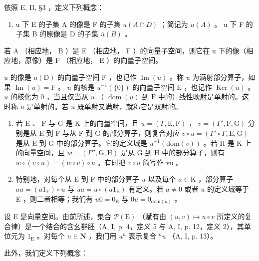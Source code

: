 依照 E, II, §3 ，定义下列概念：

\begin{enumerate}
\def\labelenumi{(\roman{enumi})}
\tightlist
\item
  u 下 E 的子集 A 的像是 F 的子集 \(u(A \cap D)\) ；简记为 \(u(A)\) 。 u 下 F 的子集 B 的原像是 D 的子集 \(\overline{u}(B)\) 。
\end{enumerate}

若 A （相应地， B ）是 E （相应地， F ）的向量子空间，则它在 u 下的像（相应地，原像）是 F （相应地， E ）的向量子空间。

 \(u\) 的像是 \(u(\mathrm{D})\) 的向量子空间 \(\mathrm{F}\) ，也记作 \(\operatorname{Im}(u)\) 。称 \(u\) 为满射部分算子，如果 \(\operatorname{Im}(u) = \mathrm{F}\) 。 \(u\) 的核是 \(u^{-1}(\{0\})\) 的向量子空间 \(\mathrm{E}\) ，也记作 \(\operatorname{Ker}(u)\) 。 \(u\) 的核化为 0 ，当且仅当从 \(u\) （ \(\operatorname{dom}(u)\) 到 \(\mathrm{F}\) 中的）线性映射是单射的。这时称 \(u\) 是单射的。若 \(u\) 既单射又满射，就称它是双射的。

\begin{enumerate}
\def\labelenumi{(\roman{enumi})}
\setcounter{enumi}{1}
\item
  若 E 、 F 与 G 是 K 上的向量空间，且 \(u = (\Gamma, \mathrm{E}, \mathrm{F})\) ， \(v = (\Gamma', \mathrm{F}, \mathrm{G})\) 分别是从 E 到 F 与从 F 到 G 的部分算子，则复合对应 \(v \circ u = (\Gamma' \circ \Gamma, \mathrm{E}, \mathrm{G})\) 是从 E 到 G 中的部分算子。它的定义域是 \(u^{-1}(\mathrm{dom}(v))\) 。若 H 是 K 上的向量空间，且 \(w = (\Gamma'', \mathrm{G}, \mathrm{H})\) 是从 G 到 H 中的部分算子，则有 \(w \circ (v \circ u) = (w \circ v) \circ u\) 。有时把 \(v \circ u\) 简写作 vu 。
\item
  特别地，对每个从 E 到 F 中的部分算子 \(u\) 以及每个 \(a \in \mathrm{K}\) ，部分算子 \(au = (a1_{\mathrm{F}}) \circ u\) 与 \(ua = u \circ (a1_{\mathrm{E}})\) 有定义。若 \(a \neq 0\) 或者 \(u\) 的定义域等于 E ，则二者相等；我们有 \(u0 = 0_{\mathrm{E}}\) 与 \(0u = 0_{\mathrm{dom}(u)}\) 。
\end{enumerate}

设 E 是向量空间。由前所述，集合 \(\mathcal{P}(\mathrm{E})\) （赋有由 \((u,v)\mapsto u\circ v\) 所定义的复合律）是一个结合的含幺群胚（A, I, p. 4，定义 5 与 A, I, p. 12，定义 2），其单位元为 \(1_{\mathrm{E}}\) 。对每个 \(n\in \mathbf{N}\) ，我们用 \(u^n\) 表示复合 \({}^n u\) （A, I, p. 13）。

此外，我们定义下列概念：

